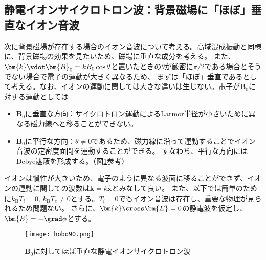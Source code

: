 \newpage

\subsection{静電イオンサイクロトロン波：背景磁場に「ほぼ」垂直なイオン音波}
次に背景磁場が存在する場合のイオン音波について考える。高域混成振動と同様に、背景磁場の効果を見たいため、磁場に垂直な成分を考える。
また、$\bm{k}\vdot\bm{B}_0 = kB_0\cos\theta$と置いたときの$\theta$が厳密に$\pi/2$である場合とそうでない場合で電子の運動が大きく異なるため、
まずは「ほぼ」垂直であるとして考える。なお、イオンの運動に関しては大きな違いは生じない。電子が$\bm{B}_0$に対する運動としては
\begin{itemize}
	\item $\bm{B}_0$に垂直な方向：サイクロトロン運動によるLarmor半径が小さいために異なる磁力線へと移ることができない。
	\item $\bm{B}_0$に平行な方向：$\theta\neq 0$であるため、磁力線に沿って運動することでイオン音波の定密度面間を運動することができる。
	      すなわち、平行な方向にはDebye遮蔽を形成する。（図\ref{fig:hobo90}参考）
\end{itemize}
イオンは慣性が大きいため、電子のように異なる波面に移ることができず、イオンの運動に関しての波数は$\bm{k} = k\hat{\bm{x}}$とみなして良い。
また、以下では簡単のために$k_{\text{B}}T_i = 0,\,k_{\text{B}}T_e\neq 0$とする。$T_i=0$でもイオン音波は存在し、重要な物理が見られるため問題ない。
さらに、$\bm{k}\cross\bm{E} = 0$の静電波を仮定し、$\bm{E} = -\grad\phi$とする。
\begin{figure}[H]
	\centering
	\texttt{[image: hobo90.png]}
	\caption{$\bm{B}_0$に対してほぼ垂直な静電イオンサイクロトロン波}
	\label{fig:hobo90}
\end{figure}

